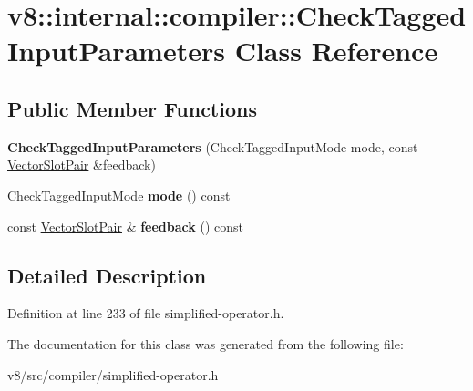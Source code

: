 \hypertarget{classv8_1_1internal_1_1compiler_1_1CheckTaggedInputParameters}{}\section{v8\+:\+:internal\+:\+:compiler\+:\+:Check\+Tagged\+Input\+Parameters Class Reference}
\label{classv8_1_1internal_1_1compiler_1_1CheckTaggedInputParameters}
\subsection*{Public Member Functions}
\begin{DoxyCompactItemize}
\item 
\mbox{\label{classv8_1_1internal_1_1compiler_1_1CheckTaggedInputParameters_ad075805c389cb295b98672755aa60991}} 
{\bfseries Check\+Tagged\+Input\+Parameters} (Check\+Tagged\+Input\+Mode mode, const \mbox{\hyperlink{classv8_1_1internal_1_1VectorSlotPair}{Vector\+Slot\+Pair}} \&feedback)
\item 
\mbox{\label{classv8_1_1internal_1_1compiler_1_1CheckTaggedInputParameters_adf9623a0de38c32f214f741d28ae61dd}} 
Check\+Tagged\+Input\+Mode {\bfseries mode} () const
\item 
\mbox{\label{classv8_1_1internal_1_1compiler_1_1CheckTaggedInputParameters_acc9737ac8b6fb4ec6e4844e1d3af035d}} 
const \mbox{\hyperlink{classv8_1_1internal_1_1VectorSlotPair}{Vector\+Slot\+Pair}} \& {\bfseries feedback} () const
\end{DoxyCompactItemize}


\subsection{Detailed Description}


Definition at line 233 of file simplified-\/operator.\+h.



The documentation for this class was generated from the following file\+:\begin{DoxyCompactItemize}
\item 
v8/src/compiler/simplified-\/operator.\+h\end{DoxyCompactItemize}
